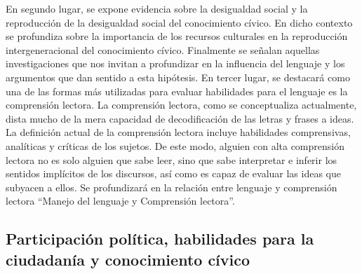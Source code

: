 \documentclass[12pt,twoside]{templates/facsothesis}
\begin{document}
En segundo lugar, se expone evidencia sobre la desigualdad social y la reproducción de la desigualdad social del conocimiento cívico. En dicho contexto se profundiza sobre la importancia de los recursos culturales en la reproducción intergeneracional del conocimiento cívico. Finalmente se señalan aquellas investigaciones que nos invitan a profundizar en la influencia del lenguaje y los argumentos que dan sentido a esta hipótesis.
En tercer lugar, se destacará como una de las formas más utilizadas para evaluar habilidades para el lenguaje es la comprensión lectora. La comprensión lectora, como se conceptualiza actualmente, dista mucho de la mera capacidad de decodificación de las letras y frases a ideas. La definición actual de la comprensión lectora incluye habilidades comprensivas, analíticas y críticas de los sujetos. De este modo, alguien con alta comprensión lectora no es solo alguien que sabe leer, sino que sabe interpretar e inferir los sentidos implícitos de los discursos, así como es capaz de evaluar las ideas que subyacen a ellos. Se profundizará en la relación entre lenguaje y comprensión lectora ``Manejo del lenguaje y Comprensión lectora''.

\hypertarget{participaciuxf3n-poluxedtica-habilidades-para-la-ciudadanuxeda-y-conocimiento-cuxedvico}{%
\subsection{Participación política, habilidades para la ciudadanía y conocimiento cívico}\label{participaciuxf3n-poluxedtica-habilidades-para-la-ciudadanuxeda-y-conocimiento-cuxedvico}}
\end{document}
